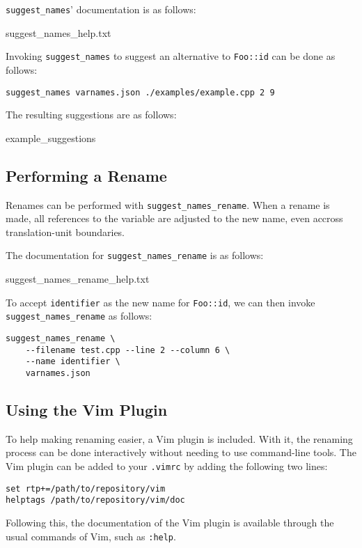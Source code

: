 \lstinline|suggest_names|' documentation is as follows:

	{suggest_names_help.txt}

Invoking \lstinline|suggest_names| to suggest an alternative to
\lstinline|Foo::id| can be done as follows:

\begin{lstlisting}
suggest_names varnames.json ./examples/example.cpp 2 9
\end{lstlisting}

The resulting suggestions are as follows:

		{example_suggestions}

\subsection{Performing a Rename}
Renames can be performed with \lstinline|suggest_names_rename|. When a rename is
made, all references to the variable are adjusted to the new name, even accross
translation-unit boundaries.

The documentation for \lstinline|suggest_names_rename| is as follows:

		{suggest_names_rename_help.txt}

To accept \lstinline|identifier| as the new name for \lstinline|Foo::id|, we can
then invoke \lstinline|suggest_names_rename| as follows:
\begin{lstlisting}[caption={Invocation of \lstinline|suggest_name_rename|}]
suggest_names_rename \
	--filename test.cpp --line 2 --column 6 \
	--name identifier \
	varnames.json
\end{lstlisting}

\subsection{Using the Vim Plugin}
To help making renaming easier, a Vim \cite{vim} plugin is included.
With it, the renaming process can be done interactively without needing to use
command-line tools.
The Vim plugin can be added to your \lstinline|.vimrc| by adding the following
two lines:

\begin{lstlisting}[language=vimscript, caption={Adding the Vim plugin}]
set rtp+=/path/to/repository/vim
helptags /path/to/repository/vim/doc
\end{lstlisting}

Following this, the documentation of the Vim plugin is available through the
usual commands of Vim, such as \lstinline|:help|.

